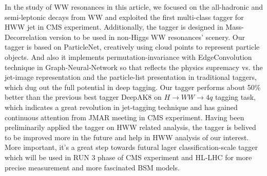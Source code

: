 \begin{eabstract}
    In the study of WW resonances in this article, we focused on the all-hadronic and semi-leptonic decays from WW and exploited the first multi-class tagger for HWW jet in CMS experiment. Additionally, the tagger is designed in Mass-Decorrelation version to be used in non-Higgs WW resonances' scenery. Our tagger is based on ParticleNet, creatively using cloud points to represent particle objects. And also it implements permutation-invariance with EdgeConvolution technique in Graph-Neural-Network so that reflects the physics supremacy vs. the jet-image representation and the particle-list presentation in traditional taggers, which dug out the full potential in deep tagging. Our tagger performs about 50\% better than the previous best tagger DeepAK8 on $H\to WW\to 4q$ tagging task, which indicates a great revolution in jet-tagging technique and has gained continuous attention from JMAR meeting in CMS experiment. Having been preliminarily applied the tagger on HWW related analysis, the tagger is belived to be improved more in the future and help in HWW analysis of our interest. More important, it's a great step towards futural lager classification-scale tagger which will be used in RUN 3 phase of CMS experiment and HL-LHC for more precise measurement and more fascinated BSM models.
\end{eabstract}

